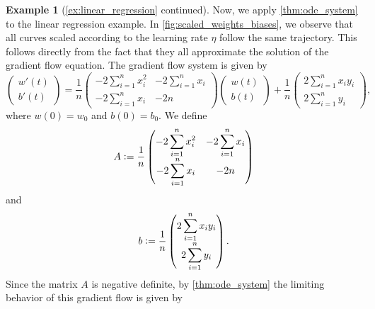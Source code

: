 \documentclass[12pt]{article}
\theoremstyle{definition}
\newtheorem{example}[example]{Example}
\numberwithin{equation}{section}
\newcommand{\defeq}{\vcentcolon=}
\begin{document}
\begin{example}[\autoref{ex:linear_regression} continued]
  Now, we apply \autoref{thm:ode_system} to the linear regression example. In \autoref{fig:scaled_weights_biases}, we observe that all curves scaled according to the learning rate $\eta$ follow the same trajectory. This follows directly from the fact that they all approximate the solution of the gradient flow equation. The gradient flow system is given by
  \begin{equation*}
    \begin{pmatrix}
      w'(t)      \\
      b'(t)     
  \end{pmatrix}
  = \frac{1}{n}
  \begin{pmatrix}
    -2  \displaystyle\sum_{i=1}^n x_i^2  &  -2  \displaystyle\sum_{i=1}^n x_i      \\
      -2  \displaystyle\sum_{i=1}^n x_i  &  -2n      
  \end{pmatrix}
  \begin{pmatrix}
    w(t)     \\
    b(t)    
  \end{pmatrix}
  + \frac{1}{n}
  \begin{pmatrix}
    2  \displaystyle\sum_{i=1}^n x_i y_i     \\
    2  \displaystyle\sum_{i=1}^n y_i    
  \end{pmatrix},
  \end{equation*}
  where $w(0) = w_{0}$ and $b(0) = b_0$. We define 
  \begin{equation*}
    A \defeq \frac{1}{n}
    \begin{pmatrix}
      -2  \displaystyle\sum_{i=1}^n x_i^2  &  -2  \displaystyle\sum_{i=1}^n x_i      \\
        -2  \displaystyle\sum_{i=1}^n x_i  &  -2n      
    \end{pmatrix}
  \end{equation*}
  and
  \begin{equation*}
    b \defeq
    \frac{1}{n}
  \begin{pmatrix}
    2  \displaystyle\sum_{i=1}^n x_i y_i     \\
    2  \displaystyle\sum_{i=1}^n y_i    
  \end{pmatrix}.
  \end{equation*}
  Since the matrix $A$ is negative definite, by \autoref{thm:ode_system} the limiting behavior of this gradient flow is given by 
  \begin{equation*}

\end{equation*}
\end{example}
\end{document}

